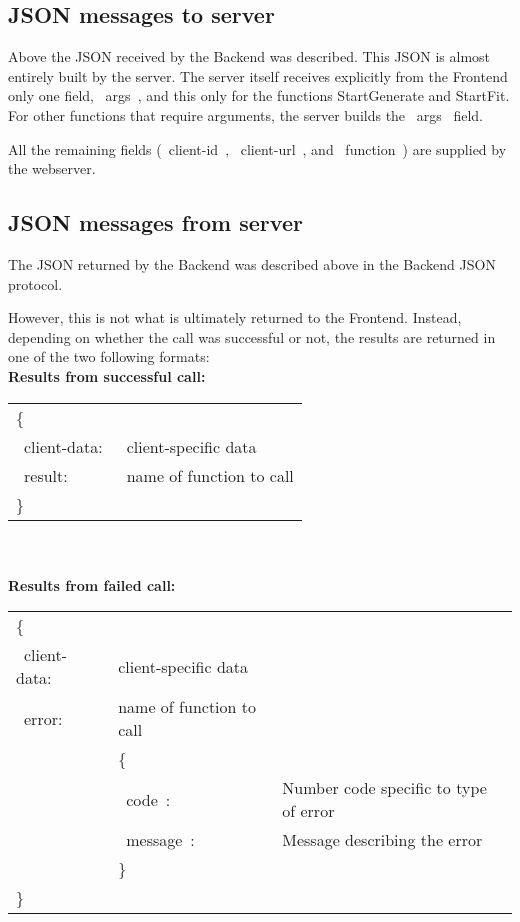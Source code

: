 \documentclass[12pt]{article}
\begin{document}
	
\subsection{JSON messages to server}

Above the JSON received by the Backend was described. This JSON is almost entirely built by the server. The server itself receives explicitly from the Frontend only one field, ~args~, and this only for the functions StartGenerate and StartFit. For other functions that require arguments, the server builds the ~args~ field.

All the remaining fields (~client-id~, ~client-url~, and ~function~) are supplied by the webserver.

\subsection{JSON messages from server}

The JSON returned by the Backend was described above in the Backend JSON protocol.

However, this is not what is ultimately returned to the Frontend. Instead, depending on whether the call was successful or not, the results are returned in one of the two following formats:
\\


\noindent \textbf{Results from successful call:}
\\

\begin{tabular}{l l}
	\{ \\
	~client-data:~ &  client-specific data\\ 
	~result:~ & name of function to call\\ 
	\} 
\end{tabular} 
\\
\\

\noindent \textbf{Results from failed call:}
\\

\begin{tabular}{l l l}
	\{ \\
	~client-data:~ &  client-specific data & \\ 
	~error:~ & name of function to call &\\ 
	&	\{\\
	& ~code~: & Number code specific to type of error\\
	& ~message~: & Message describing the error\\
	&	\} \\
	\}
\end{tabular} 
\\
\\
\end{document}
